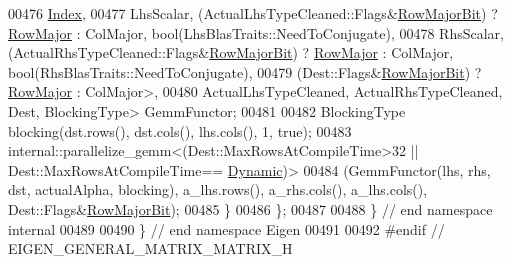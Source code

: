 \begin{DoxyCode}
00476         \hyperlink{namespace_eigen_a62e77e0933482dafde8fe197d9a2cfde}{Index},
00477         LhsScalar, (ActualLhsTypeCleaned::Flags&\hyperlink{group__flags_gae4f56c2a60bbe4bd2e44c5b19cbe8762}{RowMajorBit}) ? 
      \hyperlink{group__enums_ggaacded1a18ae58b0f554751f6cdf9eb13acfcde9cd8677c5f7caf6bd603666aae3}{RowMajor} : ColMajor, \textcolor{keywordtype}{bool}(LhsBlasTraits::NeedToConjugate),
00478         RhsScalar, (ActualRhsTypeCleaned::Flags&\hyperlink{group__flags_gae4f56c2a60bbe4bd2e44c5b19cbe8762}{RowMajorBit}) ? 
      \hyperlink{group__enums_ggaacded1a18ae58b0f554751f6cdf9eb13acfcde9cd8677c5f7caf6bd603666aae3}{RowMajor} : ColMajor, \textcolor{keywordtype}{bool}(RhsBlasTraits::NeedToConjugate),
00479         (Dest::Flags&\hyperlink{group__flags_gae4f56c2a60bbe4bd2e44c5b19cbe8762}{RowMajorBit}) ? \hyperlink{group__enums_ggaacded1a18ae58b0f554751f6cdf9eb13acfcde9cd8677c5f7caf6bd603666aae3}{RowMajor} : ColMajor>,
00480       ActualLhsTypeCleaned, ActualRhsTypeCleaned, Dest, BlockingType> GemmFunctor;
00481 
00482     BlockingType blocking(dst.rows(), dst.cols(), lhs.cols(), 1, \textcolor{keyword}{true});
00483     internal::parallelize\_gemm<(Dest::MaxRowsAtCompileTime>32 || Dest::MaxRowsAtCompileTime==
      \hyperlink{namespace_eigen_ad81fa7195215a0ce30017dfac309f0b2}{Dynamic})>
00484         (GemmFunctor(lhs, rhs, dst, actualAlpha, blocking), a\_lhs.rows(), a\_rhs.cols(), a\_lhs.cols(), 
      Dest::Flags&\hyperlink{group__flags_gae4f56c2a60bbe4bd2e44c5b19cbe8762}{RowMajorBit});
00485   \}
00486 \};
00487 
00488 \} \textcolor{comment}{// end namespace internal}
00489 
00490 \} \textcolor{comment}{// end namespace Eigen}
00491 
00492 \textcolor{preprocessor}{#endif // EIGEN\_GENERAL\_MATRIX\_MATRIX\_H}
\end{DoxyCode}

